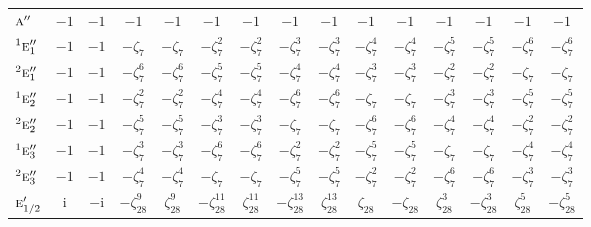 \documentclass[10pt,a4paper]{article}
\makeatletter
\def\grouprule#1#2{\noalign{\marks\LTgroupmarks{\the\belowrulesep}\nobreak\vskip#1%
  \vskip\aboverulesep}\multispan\LT@cols\unskip{\leaders\hrule\@height#2\hfill\kern\z@}\cr
  \noalign{\penalty\LTrulebreak\vskip\belowrulesep\global\@lastruleclass\z@}}
\numberwithin{equation}{section}
\newcommand{\irr}[1]{\text{\normalfont\scshape #1}}
\newcommand{\conjpair}[1]{{}^{#1}}
\newcommand{\iunit}{\mathrm{i}}
\newcommand{\rootunity}[1]{\zeta_{#1}}
\makeatother
\begin{document}
{\begin{longtable}{@{}lcccccccccccccc@{}}
$\irr{a}''$ & $-1$ & $-1$ & $-1$ & $-1$ & $-1$ & $-1$ & $-1$ & $-1$ & $-1$ & $-1$ & $-1$ & $-1$ & $-1$ & $-1$\\
$\conjpair{1}\irr{e}_{1}''$ & $-1$ & $-1$ & $-\rootunity{7}$ & $-\rootunity{7}$ & $-\rootunity{7}^{2}$ & $-\rootunity{7}^{2}$ & $-\rootunity{7}^{3}$ & $-\rootunity{7}^{3}$ & $-\rootunity{7}^{4}$ & $-\rootunity{7}^{4}$ & $-\rootunity{7}^{5}$ & $-\rootunity{7}^{5}$ & $-\rootunity{7}^{6}$ & $-\rootunity{7}^{6}$\\
$\conjpair{2}\irr{e}_{1}''$ & $-1$ & $-1$ & $-\rootunity{7}^{6}$ & $-\rootunity{7}^{6}$ & $-\rootunity{7}^{5}$ & $-\rootunity{7}^{5}$ & $-\rootunity{7}^{4}$ & $-\rootunity{7}^{4}$ & $-\rootunity{7}^{3}$ & $-\rootunity{7}^{3}$ & $-\rootunity{7}^{2}$ & $-\rootunity{7}^{2}$ & $-\rootunity{7}$ & $-\rootunity{7}$\\
$\conjpair{1}\irr{e}_{2}''$ & $-1$ & $-1$ & $-\rootunity{7}^{2}$ & $-\rootunity{7}^{2}$ & $-\rootunity{7}^{4}$ & $-\rootunity{7}^{4}$ & $-\rootunity{7}^{6}$ & $-\rootunity{7}^{6}$ & $-\rootunity{7}$ & $-\rootunity{7}$ & $-\rootunity{7}^{3}$ & $-\rootunity{7}^{3}$ & $-\rootunity{7}^{5}$ & $-\rootunity{7}^{5}$\\
$\conjpair{2}\irr{e}_{2}''$ & $-1$ & $-1$ & $-\rootunity{7}^{5}$ & $-\rootunity{7}^{5}$ & $-\rootunity{7}^{3}$ & $-\rootunity{7}^{3}$ & $-\rootunity{7}$ & $-\rootunity{7}$ & $-\rootunity{7}^{6}$ & $-\rootunity{7}^{6}$ & $-\rootunity{7}^{4}$ & $-\rootunity{7}^{4}$ & $-\rootunity{7}^{2}$ & $-\rootunity{7}^{2}$\\
$\conjpair{1}\irr{e}_{3}''$ & $-1$ & $-1$ & $-\rootunity{7}^{3}$ & $-\rootunity{7}^{3}$ & $-\rootunity{7}^{6}$ & $-\rootunity{7}^{6}$ & $-\rootunity{7}^{2}$ & $-\rootunity{7}^{2}$ & $-\rootunity{7}^{5}$ & $-\rootunity{7}^{5}$ & $-\rootunity{7}$ & $-\rootunity{7}$ & $-\rootunity{7}^{4}$ & $-\rootunity{7}^{4}$\\
$\conjpair{2}\irr{e}_{3}''$ & $-1$ & $-1$ & $-\rootunity{7}^{4}$ & $-\rootunity{7}^{4}$ & $-\rootunity{7}$ & $-\rootunity{7}$ & $-\rootunity{7}^{5}$ & $-\rootunity{7}^{5}$ & $-\rootunity{7}^{2}$ & $-\rootunity{7}^{2}$ & $-\rootunity{7}^{6}$ & $-\rootunity{7}^{6}$ & $-\rootunity{7}^{3}$ & $-\rootunity{7}^{3}$\\
\grouprule{0pt}{\lightrulewidth}
$\irr{e}_{1/2}'$ & $\iunit{}$ & $-\iunit{}$ & $-\rootunity{28}^{9}$ & $\rootunity{28}^{9}$ & $-\rootunity{28}^{11}$ & $\rootunity{28}^{11}$ & $-\rootunity{28}^{13}$ & $\rootunity{28}^{13}$ & $\rootunity{28}$ & $-\rootunity{28}$ & $\rootunity{28}^{3}$ & $-\rootunity{28}^{3}$ & $\rootunity{28}^{5}$ & $-\rootunity{28}^{5}$\\

\end{longtable}}
\end{document}
